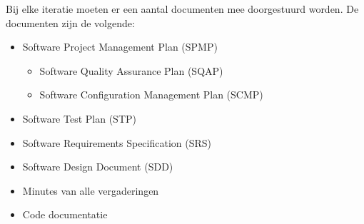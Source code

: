 Bij elke iteratie moeten er een aantal documenten mee doorgestuurd worden. \newline
De documenten zijn de volgende:

\begin{itemize}
\item Software Project Management Plan (SPMP)
\begin{itemize}
\item Software Quality Assurance Plan (SQAP)
\item Software Configuration Management Plan (SCMP)
\end{itemize}

\item Software Test Plan (STP)
\item Software Requirements Specification (SRS)
\item Software Design Document (SDD)
\item Minutes van alle vergaderingen 
\item Code documentatie 
\end{itemize}


